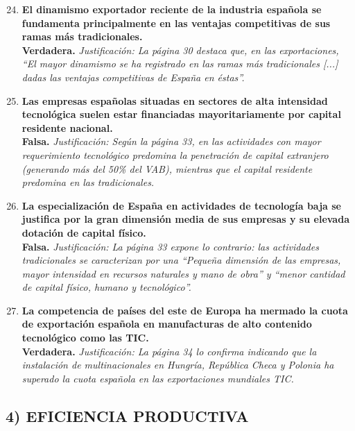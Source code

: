 \begin{enumerate}[label=\textbf{\arabic*.}]
    \setcounter{enumi}{23}

    \item \textbf{El dinamismo exportador reciente de la industria española se fundamenta principalmente en las ventajas competitivas de sus ramas más tradicionales.} \\
    \textbf{Verdadera.} \textit{Justificación: La página 30 destaca que, en las exportaciones, ``El mayor dinamismo se ha registrado en las ramas más tradicionales [...] dadas las ventajas competitivas de España en éstas''.}

    \item \textbf{Las empresas españolas situadas en sectores de alta intensidad tecnológica suelen estar financiadas mayoritariamente por capital residente nacional.} \\
    \textbf{Falsa.} \textit{Justificación: Según la página 33, en las actividades con mayor requerimiento tecnológico predomina la penetración de capital extranjero (generando más del 50\% del VAB), mientras que el capital residente predomina en las tradicionales.}

    \item \textbf{La especialización de España en actividades de tecnología baja se justifica por la gran dimensión media de sus empresas y su elevada dotación de capital físico.} \\
    \textbf{Falsa.} \textit{Justificación: La página 33 expone lo contrario: las actividades tradicionales se caracterizan por una ``Pequeña dimensión de las empresas, mayor intensidad en recursos naturales y mano de obra'' y ``menor cantidad de capital físico, humano y tecnológico''.}

    \item \textbf{La competencia de países del este de Europa ha mermado la cuota de exportación española en manufacturas de alto contenido tecnológico como las TIC.} \\
    \textbf{Verdadera.} \textit{Justificación: La página 34 lo confirma indicando que la instalación de multinacionales en Hungría, República Checa y Polonia ha superado la cuota española en las exportaciones mundiales TIC.}

\end{enumerate}

\subsection*{4) EFICIENCIA PRODUCTIVA}

